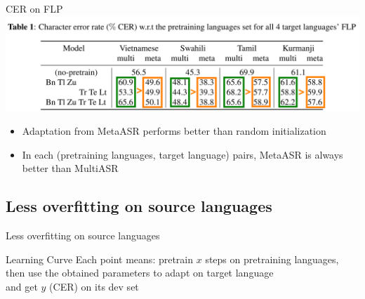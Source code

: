 \documentclass{beamer}
\begin{document}
\begin{frame}[t]{CER on FLP}
  \center \includegraphics[width=1.0\textwidth]{fig/flp-hl2.png}

  \begin{itemize}
    \item Adaptation from MetaASR performs better than random initialization
    \item In each (pretraining languages, target language) pairs, MetaASR is always better than MultiASR
  \end{itemize}
\end{frame}


\subsection{Less overfitting on source languages}
\begin{frame}
	\begin{center}
    \LARGE{Less overfitting on source languages}
	\end{center}
\end{frame}
\begin{frame}[t]{Learning Curve}
  Each point means: pretrain $x$ steps on pretraining languages, \\then use the obtained parameters  to adapt on target language \\and get $y$ (CER) on its dev set

    \begin{figure}[H]
    \centering
  \end{figure}
\end{frame}
\end{document}
